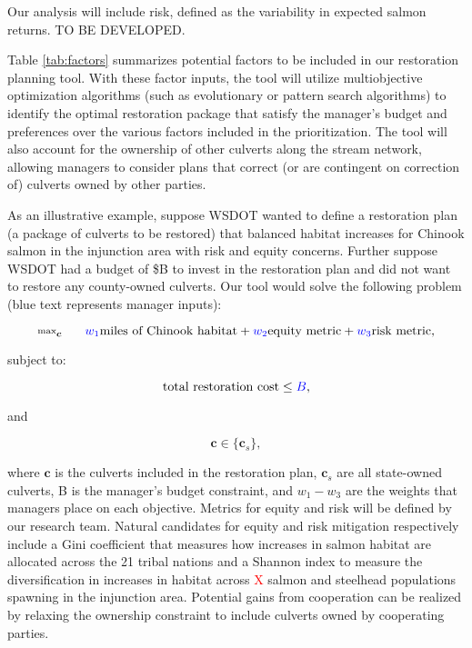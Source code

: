 \documentclass[12pt]{elsarticle}
\begin{document}
Our analysis will include risk, defined as the variability in expected salmon returns. TO BE DEVELOPED.

Table \ref{tab:factors} summarizes potential factors to be included in our restoration planning tool. With these factor inputs, the tool will utilize multiobjective optimization algorithms (such as evolutionary or pattern search algorithms) to identify the optimal restoration package that satisfy the manager's budget and preferences over the various factors included in the prioritization. The tool will also account for the ownership of other culverts along the stream network, allowing managers to consider plans that correct (or are contingent on correction of) culverts owned by other parties.

As an illustrative example, suppose WSDOT wanted to define a restoration plan (a package of culverts to be restored) that balanced habitat increases for Chinook salmon in the injunction area with risk and equity concerns. Further suppose WSDOT had a budget of \$B to invest in the restoration plan and did not want to restore any county-owned culverts. Our tool would solve the following problem (blue text represents manager inputs):

\begin{equation*}
\substack{\text{max}}_{\boldsymbol{c}}\hspace{0.25in} \textcolor{blue}{w_1} \text{miles of Chinook habitat} + \textcolor{blue}{w_2} \text{equity metric} + \textcolor{blue}{w_3} \text{risk metric},
\end{equation*}

\noindent subject to:

\begin{equation*}
\text{total restoration cost} \le \textcolor{blue}{B},
\end{equation*}

\noindent and

\begin{equation*}
\boldsymbol{c} \in \{\boldsymbol{c}_s  \},
\end{equation*}

where $\boldsymbol{c}$ is the culverts included in the restoration plan, $\boldsymbol{c}_s$ are all state-owned culverts, B is the manager's budget constraint, and $w_1-w_3$ are the weights that managers place on each objective. Metrics for equity and risk will be defined by our research team. Natural candidates for equity and risk mitigation respectively include a Gini coefficient that measures how increases in salmon habitat are allocated across the 21 tribal nations and a Shannon index to measure the diversification in increases in habitat across \textcolor{red}{X} salmon and steelhead populations spawning in the injunction area. Potential gains from cooperation can be realized by relaxing the ownership constraint to include culverts owned by cooperating parties.
\end{document}

